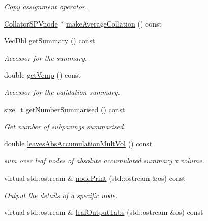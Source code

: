 \begin{DoxyCompactItemize}
\begin{DoxyCompactList}\small\item\em \-Copy assignment operator. \end{DoxyCompactList}\item 
\hyperlink{classsubpavings_1_1CollatorSPVnode}{\-Collator\-S\-P\-Vnode} $\ast$ \hyperlink{classsubpavings_1_1CollatorSPVnode_ad0d2a5d445ac27dd3bf81a6f55c4087f}{make\-Average\-Collation} () const 
\item 
\hyperlink{namespacesubpavings_a6b4d2e61b2f0b65cacc9c9322d89bc37}{\-Vec\-Dbl} \hyperlink{classsubpavings_1_1CollatorSPVnode_ad7fa37be86eb1d964b384a090dc3552f}{get\-Summary} () const 
\begin{DoxyCompactList}\small\item\em \-Accessor for the summary. \end{DoxyCompactList}\item 
double \hyperlink{classsubpavings_1_1CollatorSPVnode_ac3cc6fb2f09dc7d6d99b52631fc4f60e}{get\-Vemp} () const 
\begin{DoxyCompactList}\small\item\em \-Accessor for the validation summary. \end{DoxyCompactList}\item 
size\-\_\-t \hyperlink{classsubpavings_1_1CollatorSPVnode_a72f2564ee548571ef026a8548ca0b0ba}{get\-Number\-Summarised} () const 
\begin{DoxyCompactList}\small\item\em \-Get number of subpavings summarised. \end{DoxyCompactList}\item 
double \hyperlink{classsubpavings_1_1CollatorSPVnode_ae996eeb1103aa689f6f64d3db742ce2f}{leaves\-Abs\-Accumulation\-Mult\-Vol} () const 
\begin{DoxyCompactList}\small\item\em sum over leaf nodes of absolute accumulated summary x volume. \end{DoxyCompactList}\item 
virtual std\-::ostream \& \hyperlink{classsubpavings_1_1CollatorSPVnode_a782737eae50163bbae2dc9c4b5e23aec}{node\-Print} (std\-::ostream \&os) const 
\begin{DoxyCompactList}\small\item\em \-Output the details of a specific node. \end{DoxyCompactList}\item 
virtual std\-::ostream \& \hyperlink{classsubpavings_1_1CollatorSPVnode_a60e3798526abbe3db915b8a9a9d0aa19}{leaf\-Output\-Tabs} (std\-::ostream \&os) const 

\end{DoxyCompactItemize}
